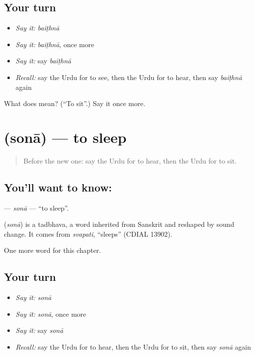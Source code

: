 \subsection*{Your turn}
\begin{itemize}
\raggedright
  \item \emph{Say it:} \emph{baiṭhnā}
  \item \emph{Say it:} \emph{baiṭhnā}, once more
  \item \emph{Say it:} say \emph{baiṭhnā}
  \item \emph{Recall:} say the Urdu for to see, then the Urdu for to hear, then say \emph{baiṭhnā} again
\end{itemize}

\begin{tcolorbox}[breakable,colback=teal!4,colframe=teal!35!black,title={Before you move on}]
What does  mean? (\textquotedblleft{}To sit\textquotedblright{}.) Say it once more.
\end{tcolorbox}
\section[\texorpdfstring{\ur{سونا} (sonā)}{سونا (sonā)}]{ (sonā) — to sleep}

\label{lesson:UR-C47-sona}



\begin{quote}
Before the new one: say the Urdu for to hear, then the Urdu for to sit.
\end{quote}

\subsection*{You'll want to know: }
\textbf{} — \emph{sonā} — \textquotedblleft{}to sleep\textquotedblright{}.

\begin{cousinweb}
\textbf{} (\emph{sonā}) is a tadbhava, a word inherited from Sanskrit and reshaped by sound change. It comes from \emph{svapati}, \textquotedblleft{}sleeps\textquotedblright{} (CDIAL 13902).
\end{cousinweb}

\begin{grammarlens}[title={What you've built}]
One more word for this chapter.
\end{grammarlens}

\subsection*{Your turn}
\begin{itemize}
\raggedright
  \item \emph{Say it:} \emph{sonā}
  \item \emph{Say it:} \emph{sonā}, once more
  \item \emph{Say it:} say \emph{sonā}
  \item \emph{Recall:} say the Urdu for to hear, then the Urdu for to sit, then say \emph{sonā} again
\end{itemize}

